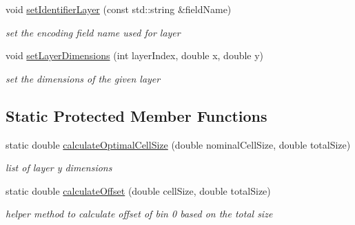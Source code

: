 \begin{DoxyCompactItemize}
void \hyperlink{class_d_d4hep_1_1_d_d_segmentation_1_1_tiled_layer_segmentation_a3fed8d866ede1df684ec06344725b72c}{set\+Identifier\+Layer} (const std\+::string \&field\+Name)
\begin{DoxyCompactList}\small\item\em set the encoding field name used for layer \end{DoxyCompactList}\item 
void \hyperlink{class_d_d4hep_1_1_d_d_segmentation_1_1_tiled_layer_segmentation_a579736d34689d340d8d4dba0b30da4ba}{set\+Layer\+Dimensions} (int layer\+Index, double x, double y)
\begin{DoxyCompactList}\small\item\em set the dimensions of the given layer \end{DoxyCompactList}\end{DoxyCompactItemize}
\subsection*{Static Protected Member Functions}
\begin{DoxyCompactItemize}
\item 
static double \hyperlink{class_d_d4hep_1_1_d_d_segmentation_1_1_tiled_layer_segmentation_a3cbdc472b5f800c0a1fc99080f1fd72d}{calculate\+Optimal\+Cell\+Size} (double nominal\+Cell\+Size, double total\+Size)
\begin{DoxyCompactList}\small\item\em list of layer y dimensions \end{DoxyCompactList}\item 
static double \hyperlink{class_d_d4hep_1_1_d_d_segmentation_1_1_tiled_layer_segmentation_a7c5f4fe56bec27c51187a8413fe96d38}{calculate\+Offset} (double cell\+Size, double total\+Size)
\begin{DoxyCompactList}\small\item\em helper method to calculate offset of bin 0 based on the total size \end{DoxyCompactList}\end{DoxyCompactItemize}
